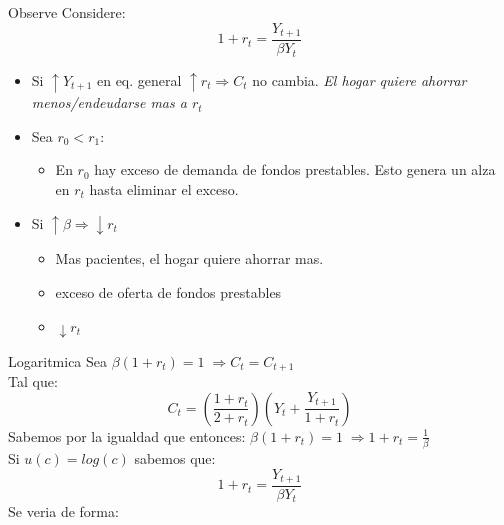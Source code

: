 \documentclass[12pt]{article}
\begin{document}
\begin{comentarioprofe}{Observe}
    Considere: $$1+r_t=\frac{Y_{t+1}}{\beta Y_t}$$
    \begin{itemize}
        \item Si $\uparrow Y_{t+1}$ en eq. general $\uparrow r_t \Rightarrow{} C_t$ no cambia. 
        \textit{El hogar quiere ahorrar menos/endeudarse mas a $r_t$}
        \item Sea $r_0<r_1$: 
        \begin{itemize}
            \item En $r_0$ hay exceso de demanda de fondos prestables. 
            Esto genera un alza en $r_t$ hasta eliminar el exceso. 
        \end{itemize}
        \item Si $\uparrow\beta \Rightarrow{} \downarrow r_t$
        \begin{itemize}
            \item Mas pacientes, el hogar quiere ahorrar mas. 
            \item exceso de oferta de fondos prestables 
            \item $\downarrow r_t$
        \end{itemize}
    \end{itemize}
\end{comentarioprofe}
\begin{ejemplo}{Logaritmica}
    Sea $\beta (1+r_t)=1\; \Rightarrow{}C_t=C_{t+1}$\\
    Tal que: $$C_t=(\frac{1+r_t}{2+r_t})(Y_t+\frac{Y_{t+1}}{1+r_t})$$
    Sabemos por la igualdad que entonces: $\beta (1+r_t)=1\; \Rightarrow{} 1+r_t=\frac{1}{\beta}$\\
    Si $u(c)=log(c)$ sabemos que: $$1+r_t=\frac{Y_{t+1}}{\beta Y_t}$$
    Se veria de forma: 
    \begin{figure} [H]
        \centering
        
        \label{fig:placeholder}
    \end{figure}
\end{ejemplo}
\end{document}
